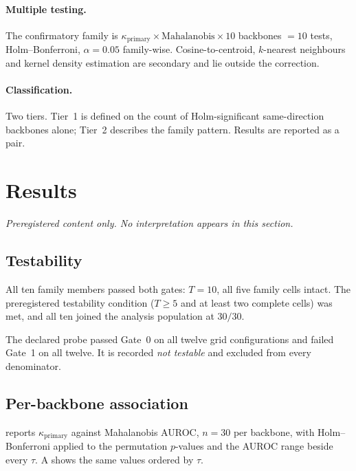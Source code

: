 \documentclass[11pt,a4paper]{article}
\newcommand{\kprim}{\ensuremath{\kappa_{\mathrm{primary}}}}
\begin{document}
\paragraph{Multiple testing.} The confirmatory family is
$\kprim \times \text{Mahalanobis} \times 10$ backbones $= 10$ tests,
Holm--Bonferroni, $\alpha = 0.05$ family-wise. Cosine-to-centroid, $k$-nearest
neighbours and kernel density estimation are secondary and lie outside the
correction.

\paragraph{Classification.} Two tiers. Tier~1 is defined on the count of
Holm-significant same-direction backbones alone; Tier~2 describes the family
pattern. Results are reported as a pair.

\section{Results}
\label{sec:results}

\emph{Preregistered content only. No interpretation appears in this section.}

\subsection{Testability}

All ten family members passed both gates: $T = 10$, all five family cells intact.
The preregistered testability condition ($T \ge 5$ and at least two complete
cells) was met, and all ten joined the analysis population at $30/30$.

The declared probe passed Gate~0 on all twelve grid configurations and failed
Gate~1 on all twelve. It is recorded \emph{not testable} and excluded from every
denominator.

\subsection{Per-backbone association}

 reports \kprim{} against Mahalanobis AUROC, $n = 30$ per
backbone, with Holm--Bonferroni applied to the permutation $p$-values and the
AUROC range beside every $\tau$. A shows the same values ordered
by $\tau$.
\end{document}
